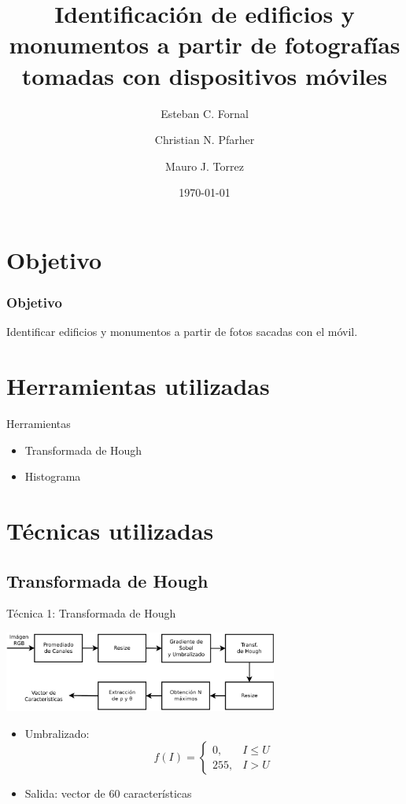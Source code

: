 \documentclass[spanish]{beamer}
\title{Identificación de edificios y monumentos a partir de fotografías tomadas
con dispositivos móviles}
\author{Esteban C. Fornal \and Christian N. Pfarher \and Mauro J. Torrez}
\date{\today}
\begin{document}
%
\frame{\titlepage}
%
\section{Objetivo}
\begin{frame}
  \frametitle{Objetivo}
  Identificar edificios y monumentos a partir de fotos sacadas
  con el móvil.
\end{frame}
%
\section{Herramientas utilizadas}
\begin{frame}{Herramientas}
  \begin{itemize}
  \item<1-> Transformada de Hough
  \item<2-> Histograma
  \end{itemize}
\end{frame}
%
\section{Técnicas utilizadas}
%
\subsection{Transformada de Hough}
\begin{frame}{Técnica 1: Transformada de Hough}
\begin{center}
  \includegraphics[width=9cm]{../diagramas/procesohough}
\end{center}
\begin{itemize}
\item Umbralizado:
  \begin{equation*}
    \label{umbral}
    f(I)=
    \begin{cases}
      0, & I\leq U\\
      255, & I > U
    \end{cases}
  \end{equation*}
\item Salida: vector de 60 características
\end{itemize}
\end{frame}
%
\end{document}
